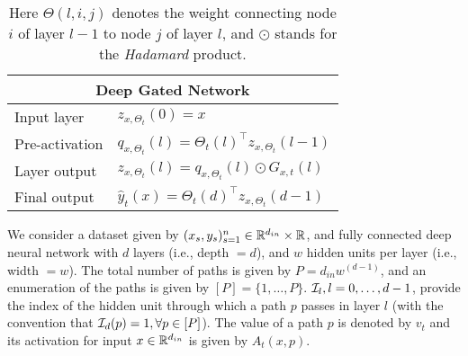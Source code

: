 \begin{table}[!htb]
\begin{minipage}{0.5\columnwidth}
{\begin{tabular}{|l|l|}
\multicolumn{2}{|c|}{Deep Gated Network}\\\hline 
Input layer & $z_{x,\Theta_t}(0)=x$ \\\hline
Pre-activation & $q_{x,\Theta_t}(l)={\Theta_t(l)}^\top z_{x,\Theta_t}(l-1)$\\\hline
Layer output & $z_{x,\Theta_t}(l)=q_{x,\Theta_t}(l)\odot G_{x,t}(l)$ \\\hline
Final output & $\hat{y}_t(x)={\Theta_t(d)}^\top z_{x,\Theta_t}(d-1)$\\\hline
\end{tabular}
}
\end{minipage}
\caption{Here $\Theta(l,i,j)$ denotes the weight connecting node $i$ of layer $l-1$ to node $j$ of layer $l$, and $\odot$ stands for the \emph{Hadamard} product.}
\label{tb:dgn-path}
\end{table}
We consider a dataset given by $(x_s,y_s)_{s=1}^n\in \mathbb{R}^{d_{in}}\times \mathbb{R}$, and fully connected deep neural network with $d$ layers (i.e., depth $=d$), and $w$ hidden units per layer (i.e., width $=w$). The total number of paths is given by $P=d_{in}w^{(d-1)}$, and an enumeration of the paths is given by $[P]=\{1,\ldots,P\}$.  $\mathcal{I}_{l},l=0,\ldots,d-1$, provide the index of the hidden unit through which a path $p$ passes in layer $l$ (with the convention that $\mathcal{I}_d(p)=1,\forall p\in [P]$). The value of a path $p$ is denoted by $v_t$ and its activation for input $x\in \mathbb{R}^{d_{in}}$ is given by $A_t(x,p)$. \hfill\\
